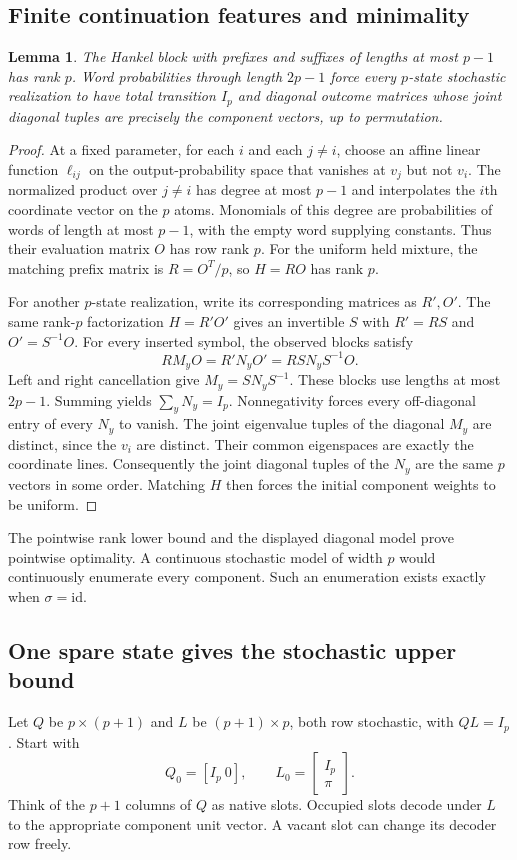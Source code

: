 \documentclass[11pt]{article}
\newtheorem{lemma}[theorem]{Lemma}
\theoremstyle{definition}\newtheorem{definition}[theorem]{Definition}
\theoremstyle{remark}\newtheorem{remark}[theorem]{Remark}
\begin{document}
\subsection{Finite continuation features and minimality}
\begin{lemma}\label{lem:rank}
The Hankel block with prefixes and suffixes of lengths at most $p-1$ has rank $p$. Word probabilities through length $2p-1$ force every $p$-state stochastic realization to have total transition $I_p$ and diagonal outcome matrices whose joint diagonal tuples are precisely the component vectors, up to permutation.
\end{lemma}
\begin{proof}
At a fixed parameter, for each $i$ and each $j\ne i$, choose an affine linear function $\ell_{ij}$ on the output-probability space that vanishes at $v_j$ but not $v_i$. The normalized product over $j\ne i$ has degree at most $p-1$ and interpolates the $i$th coordinate vector on the $p$ atoms. Monomials of this degree are probabilities of words of length at most $p-1$, with the empty word supplying constants. Thus their evaluation matrix $O$ has row rank $p$. For the uniform held mixture, the matching prefix matrix is $R=O^T/p$, so $H=RO$ has rank $p$.

For another $p$-state realization, write its corresponding matrices as $R',O'$. The same rank-$p$ factorization $H=R'O'$ gives an invertible $S$ with $R'=RS$ and $O'=S^{-1}O$. For every inserted symbol, the observed blocks satisfy
\[
 RM_yO=R'N_yO'=RSN_yS^{-1}O.
\]
Left and right cancellation give $M_y=SN_yS^{-1}$. These blocks use lengths at most $2p-1$. Summing yields $\sum_yN_y=I_p$. Nonnegativity forces every off-diagonal entry of every $N_y$ to vanish. The joint eigenvalue tuples of the diagonal $M_y$ are distinct, since the $v_i$ are distinct. Their common eigenspaces are exactly the coordinate lines. Consequently the joint diagonal tuples of the $N_y$ are the same $p$ vectors in some order. Matching $H$ then forces the initial component weights to be uniform.
\end{proof}
The pointwise rank lower bound and the displayed diagonal model prove pointwise optimality. A continuous stochastic model of width $p$ would continuously enumerate every component. Such an enumeration exists exactly when $\sigma=\mathrm{id}$.

\subsection{One spare state gives the stochastic upper bound}
Let $Q$ be $p\times(p+1)$ and $L$ be $(p+1)\times p$, both row stochastic, with $QL=I_p$. Start with
\[
 Q_0=[I_p\ 0],\qquad L_0=\begin{bmatrix}I_p\\\pi\end{bmatrix}.
\]
Think of the $p+1$ columns of $Q$ as native slots. Occupied slots decode under $L$ to the appropriate component unit vector. A vacant slot can change its decoder row freely.
\end{document}

